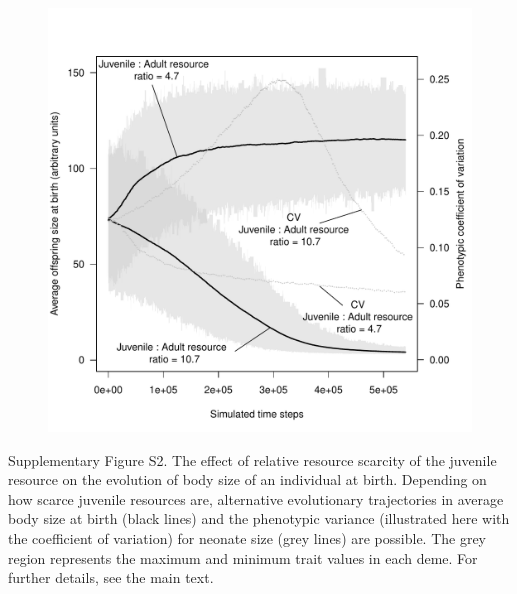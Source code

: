 \documentclass[11pt]{article}
\begin{document}
\newpage
\begin{figure}[h!]
   \includegraphics[width=\linewidth] {SupplementaryFigures/FigS2.pdf}
\end{figure}
Supplementary Figure S2. The effect of relative resource scarcity of the juvenile resource on the evolution of body size of an individual at birth. Depending on how scarce juvenile resources are, alternative evolutionary trajectories in average body size at birth (black lines) and the phenotypic variance (illustrated here with the coefficient of variation) for neonate size (grey lines) are possible. The grey region represents the maximum and minimum trait values in each deme. For further details, see the main text.
\end{document}

